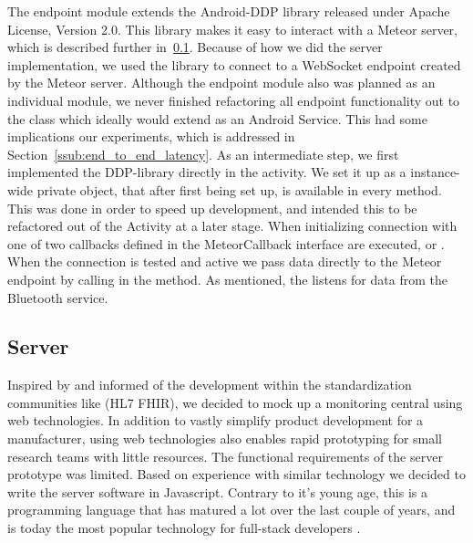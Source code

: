 The endpoint module extends the Android-DDP\cite{android:ddp} library released under Apache License, Version 2.0. This library makes it easy to interact with a Meteor server, which is described further in~\ref{sub:server}. Because of how we did the server implementation, we used the library to connect to a WebSocket endpoint created by the Meteor server.
Although the endpoint module also was planned as an individual module, we never finished refactoring all endpoint functionality out to the  class which ideally would extend as an Android Service. This had some implications our experiments, which is addressed in Section~\ref{ssub:end_to_end_latency}.
As an intermediate step, we first implemented the DDP-library directly in the \cite{NewDevice} activity. We set it up as a instance-wide private object, that after first being set up, is available in every method. This was done in order to speed up development, and intended this to be refactored out of the Activity at a later stage. When initializing connection with  one of two callbacks defined in the MeteorCallback interface are executed,  or  . When the connection is tested and active we pass data directly to the Meteor endpoint by calling  in the  method. As mentioned, the  listens for data from the Bluetooth service.



\subsection{Server} %
\label{sub:server}

Inspired by \cite{Thelen:2014ew} and informed of the development within the standardization communities like (HL7 FHIR), we decided to mock up a monitoring central using web technologies. In addition to vastly simplify product development for a manufacturer, using web technologies also enables rapid prototyping for small research teams with little resources. The functional requirements of the server prototype was limited. Based on experience with similar technology we decided to write the server software in Javascript. Contrary to it's young age, this is a programming language that has matured a lot over the last couple of years, and is today the most popular technology for full-stack developers \cite{so:survey:results}.

